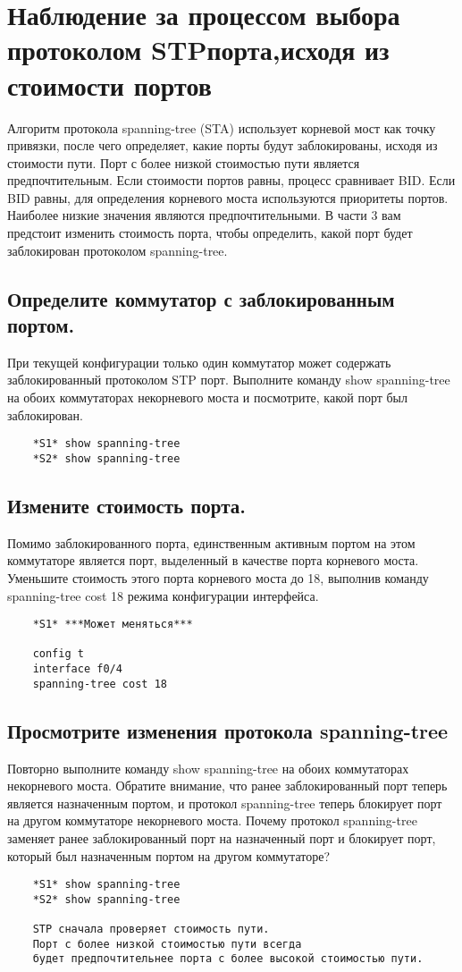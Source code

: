 \section{Наблюдение за процессом выбора протоколом STPпорта,исходя из стоимости портов}
Алгоритм протокола spanning-tree (STA) использует корневой мост как точку привязки, после чего
определяет, какие порты будут заблокированы, исходя из стоимости пути.
Порт с более низкой стоимостью пути является предпочтительным.
Если стоимости портов равны, процесс сравнивает BID\@.
Если BID равны, для определения корневого моста используются приоритеты портов.
Наиболее низкие значения являются предпочтительными.
В части 3 вам предстоит изменить стоимость порта, чтобы определить, какой порт будет заблокирован протоколом
spanning-tree.


\subsection{Определите коммутатор с заблокированным портом.}
При текущей конфигурации только один коммутатор может содержать заблокированный протоколом
STP порт.
Выполните команду show spanning-tree на обоих коммутаторах некорневого моста и посмотрите, какой порт был заблокирован.

\begin{verbatim}
    *S1* show spanning-tree
    *S2* show spanning-tree
\end{verbatim}

\subsection{Измените стоимость порта.}
Помимо заблокированного порта, единственным активным портом на этом коммутаторе является порт,
выделенный в качестве порта корневого моста.
Уменьшите стоимость этого порта корневого моста до 18, выполнив команду spanning-tree cost 18 режима конфигурации
интерфейса.


\begin{verbatim}
    *S1* ***Может меняться***

    config t
    interface f0/4
    spanning-tree cost 18
\end{verbatim}

\subsection{Просмотрите изменения протокола spanning-tree}
Повторно выполните команду show spanning-tree на обоих коммутаторах некорневого моста.
Обратите внимание, что ранее заблокированный порт теперь является назначенным портом, и
протокол spanning-tree теперь блокирует порт на другом коммутаторе некорневого моста.
Почему протокол spanning-tree заменяет ранее заблокированный порт на назначенный порт
и блокирует порт, который был назначенным портом на другом коммутаторе?
\begin{verbatim}
    *S1* show spanning-tree
    *S2* show spanning-tree

    STP сначала проверяет стоимость пути.
    Порт с более низкой стоимостью пути всегда
    будет предпочтительнее порта с более высокой стоимостью пути.
\end{verbatim}

